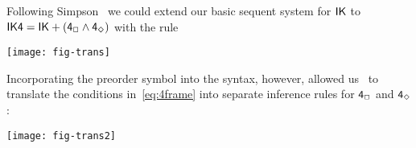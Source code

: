 \documentclass[twoside]{aiml20}
\begin{document}
Following Simpson~\cite{simpson1994} we could extend our basic sequent system for $\mathsf{IK}$ to $\mathsf{IK4} = \mathsf{IK}+(\mathsf{4_{\mathord{\Box}}}\mathbin{\wedge}\mathsf{4_{\mathord{\Diamond}}})$ with the rule%

\begin{center}
\texttt{[image: fig-trans]}
\end{center}



Incorporating the preorder symbol into the syntax, however,  allowed us~\cite{marin:morales:strassburger:hal} to %
translate the conditions in~\eqref{eq:4frame} into separate inference rules for $\mathsf{4_{\mathord{\Box}}}$ and $\mathsf{4_{\mathord{\Diamond}}}$:%

\begin{center}
	\texttt{[image: fig-trans2]}
\end{center}



\end{document}
